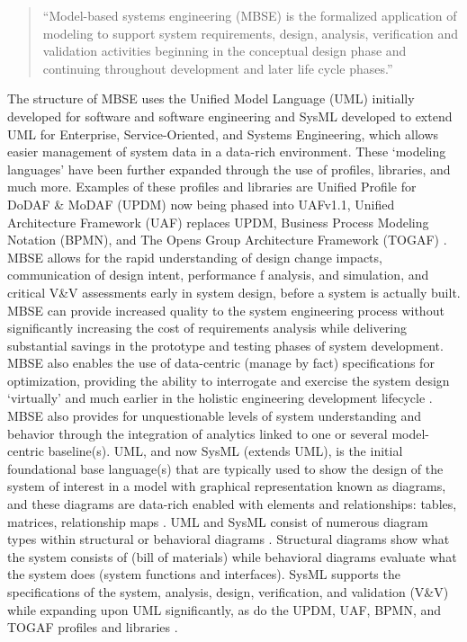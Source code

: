 \documentclass[num-refs]{wiley-article}
\begin{document}
\begin{quote}
``Model-based systems engineering (MBSE) is the formalized application of modeling to support system requirements, design, analysis, verification and validation activities beginning in the conceptual design phase and continuing throughout development and later life cycle phases.'' \cite{INCOSE_2007}
\end{quote}

The structure of MBSE uses the Unified Model Language (UML) initially developed for software and software engineering and SysML developed to extend UML for Enterprise, Service-Oriented, and Systems Engineering, which allows easier management of system data in a data-rich environment. These `modeling languages' have been further expanded through the use of profiles, libraries, and much more. Examples of these profiles and libraries are Unified Profile for DoDAF \& MoDAF (UPDM) \cite{Stroud2016} now being phased into UAFv1.1, Unified Architecture Framework (UAF) replaces UPDM, Business Process Modeling Notation (BPMN), and The Opens Group Architecture Framework (TOGAF) \cite{TaoZhi2017}. MBSE allows for the rapid understanding of design change impacts, communication of design intent, performance f analysis, and simulation, and critical V\&V assessments early in system design, before a system is actually built. MBSE can provide increased quality to the system engineering process without significantly increasing the cost of requirements analysis while delivering substantial savings in the prototype and testing phases of system development. MBSE also enables the use of data-centric (manage by fact) specifications for optimization, providing the ability to interrogate and exercise the system design `virtually' and much earlier in the holistic engineering development lifecycle \cite{Friedenthal2008}. MBSE also provides for unquestionable levels of system understanding and behavior through the integration of analytics linked to one or several model-centric baseline(s). UML, and now SysML (extends UML), is the initial foundational base language(s) that are typically used to show the design of the system of interest in a model with graphical representation known as diagrams, and these diagrams are data-rich enabled with elements and relationships: tables, matrices, relationship maps \cite{Friedenthal2008}. UML and SysML consist of numerous diagram types within structural or behavioral diagrams \cite{Friedenthal2008}. Structural diagrams show what the system consists of (bill of materials) while behavioral diagrams evaluate what the system does (system functions and interfaces). SysML supports the specifications of the system, analysis, design, verification, and validation (V\&V) while expanding upon UML significantly, as do the UPDM, UAF, BPMN, and TOGAF profiles and libraries \cite{Friedenthal2008}.
\end{document}
